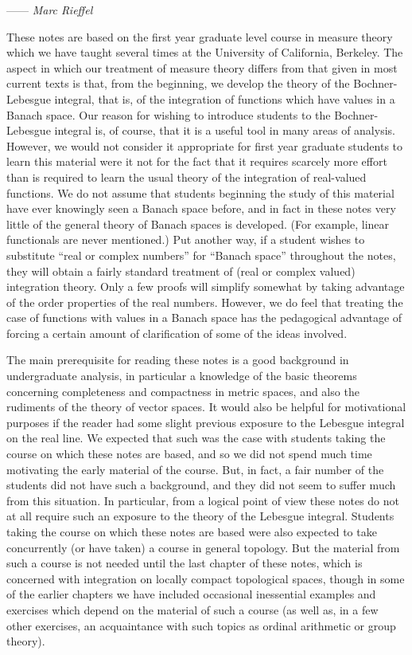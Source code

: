 
\hspace*{0pt}\hfill------ {\it Marc Rieffel}

These notes are based on the first year graduate level course in measure theory which we have taught several times at the University of California, Berkeley. The aspect in which our treatment of measure theory differs from that given in most current texts is that, from the beginning, we develop the theory of the Bochner-Lebesgue integral, that is, of the integration of functions which have values in a Banach space. Our reason for wishing to introduce students to the Bochner-Lebesgue integral is, of course, that it is a useful tool in many areas of analysis. However, we would not consider it appropriate for first year graduate students to learn this material were it not for the fact that it requires scarcely more effort than is required to learn the usual theory of the integration of real-valued functions. We do not assume that students beginning the study of this material have ever knowingly seen a Banach space before, and in fact in these notes very little of the general theory of Banach spaces is developed. (For example, linear functionals are never mentioned.) Put another way, if a student wishes to substitute ``real or complex numbers'' for ``Banach space'' throughout the notes, they will obtain a fairly standard treatment of (real or complex valued) integration theory. Only a few proofs will simplify somewhat by taking advantage of the order properties of the real numbers. However, we do feel that treating the case of functions with values in a Banach space has the pedagogical advantage of forcing a certain amount of clarification of some of the ideas involved.

The main prerequisite for reading these notes is a good background in undergraduate analysis, in particular a knowledge of the basic theorems concerning completeness and compactness in metric spaces, and also the rudiments of the theory of vector spaces. It would also be helpful for motivational purposes if the reader had some slight previous exposure to the Lebesgue integral on the real line. We expected that such was the case with students taking the course on which these notes are based, and so we did not spend much time motivating the early material of the course. But, in fact, a fair number of the students did not have such a background, and they did not seem to suffer much from this situation. In particular, from a logical point of view these notes do not at all require such an exposure to the theory of the Lebesgue integral. Students taking the course on which these notes are based were also expected to take concurrently (or have taken) a course in general topology. But the material from such a course is not needed until the last chapter of these notes, which is concerned with integration on locally compact topological spaces, though in some of the earlier chapters we have included occasional inessential examples and exercises which depend on the material of such a course (as well as, in a few other exercises, an acquaintance with such topics as ordinal arithmetic or group theory).

